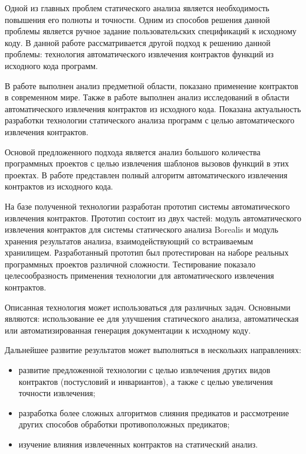 \conclusion
Одной из главных проблем статического анализа является необходимость повышения его полноты и точности. Одним из способов решения данной проблемы является ручное задание пользовательских спецификаций к исходному коду. В данной работе рассматривается другой подход к решению данной проблемы: технология автоматического извлечения контрактов функций из исходного кода программ.

В работе выполнен анализ предметной области, показано применение контрактов в современном мире. Также в работе выполнен анализ исследований в области автоматического извлечения контрактов из исходного кода. Показана актуальность разработки технологии статического анализа программ с целью автоматического извлечения контрактов.

Основой предложенного подхода является анализ большого количества программных проектов с целью извлечения шаблонов вызовов функций в этих проектах. В работе представлен полный алгоритм автоматического извлечения контрактов из исходного кода.

На базе полученной технологии разработан прототип системы автоматического извлечения контрактов. Прототип состоит из двух частей: модуль автоматического извлечения контрактов для системы статического анализа Borealis и модуль хранения результатов анализа, взаимодействующий со встраиваемым хранилищем. Разработанный прототип был протестирован на наборе реальных программных проектов различной сложности. Тестирование показало целесообразность применения технологии для автоматического извлечения контрактов.

Описанная технология может использоваться для различных задач. Основными являются: использование ее для улучшения статического анализа, автоматическая или автоматизированная генерация документации к исходному коду.

Дальнейшее развитие результатов может выполняться в нескольких направлениях:
\begin{itemize}
\item развитие предложенной технологии с целью извлечения других видов контрактов (постусловий и инвариантов), а также с целью увеличения точности извлечения;
\item разработка более сложных алгоритмов слияния предикатов и рассмотрение других способов обработки противоположных предикатов;
\item изучение влияния извлеченных контрактов на статический анализ.
\end{itemize}